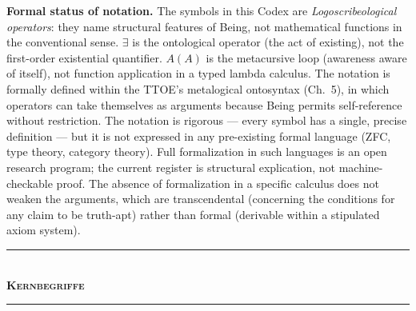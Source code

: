 \documentclass[10pt, openany, oneside]{book}
\renewcommand{\normalsize}{\fontsize{10}{13}\selectfont}
\renewcommand{\footnotesize}{\fontsize{8.5}{11}\selectfont}
\begin{document}
\vspace{0.5em}

{\footnotesize
\noindent\textbf{Formal status of notation.} The symbols in this Codex are \textit{Logoscribeological operators}: they name structural features of Being, not mathematical functions in the conventional sense. $\exists$ is the ontological operator (the act of existing), not the first-order existential quantifier. $A(A)$ is the metacursive loop (awareness aware of itself), not function application in a typed lambda calculus. The notation is formally defined within the TTOE's metalogical ontosyntax (Ch.\ 5), in which operators can take themselves as arguments because Being permits self-reference without restriction. The notation is rigorous --- every symbol has a single, precise definition --- but it is not expressed in any pre-existing formal language (ZFC, type theory, category theory). Full formalization in such languages is an open research program; the current register is structural explication, not machine-checkable proof. The absence of formalization in a specific calculus does not weaken the arguments, which are transcendental (concerning the conditions for any claim to be truth-apt) rather than formal (derivable within a stipulated axiom system).
}

\vspace{1.5em}

\newpage


\begin{center}
    \rule{0.3\textwidth}{0.4pt}\\[0.5em]
    {\normalsize\bfseries\scshape Kernbegriffe}\\[0.3em]
    \rule{0.3\textwidth}{0.4pt}
\end{center}

\vspace{1em}
\end{document}
